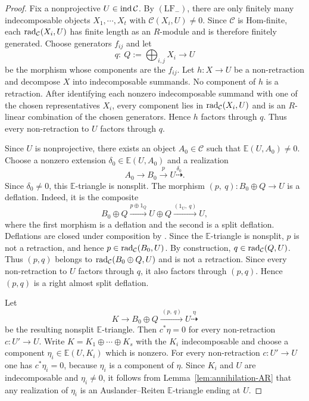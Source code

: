 \documentclass[11pt, twoside]{article}
\def\C{\mathcal{C}}
\def\E{\mathbb{E}}
\numberwithin{equation}{section}
\begin{document}
\begin{proof}
Fix a nonprojective $U\in\ind\C$.  By $(\mathrm{LF}_-)$, there are only
finitely many indecomposable objects $X_1,\cdots,X_t$ with
$\C(X_i,U)\ne0$.  Since $\C$ is Hom-finite, each $\rad_\C(X_i,U)$ has finite length as an
$R$-module and is therefore finitely generated.
Choose generators $f_{ij}$ and let
$$
 q\colon~ Q:=\bigoplus_{i,j}X_i\longrightarrow U
$$
be the morphism whose components are the $f_{ij}$.  Let $h:X\to U$ be a
non-retraction and decompose $X$ into indecomposable summands.  No component of $h$
is a retraction.  After identifying each nonzero indecomposable summand with
one of the chosen representatives $X_i$, every component lies in
$\rad_\C(X_i,U)$ and is an $R$-linear combination of the chosen generators.
Hence $h$ factors through $q$.  Thus every non-retraction to $U$ factors
through $q$.

Since $U$ is nonprojective, there exists an object $A_0\in\C$ such that
$
\E(U,A_0)\neq0.
$
Choose a nonzero extension $\delta_0\in\E(U,A_0)$ and a realization
\[
A_0\longrightarrow B_0\xrightarrow{~p~}U
\overset{\delta_0}{\dashrightarrow}.
\]
Since $\delta_0\neq0$, this $\E$-triangle is nonsplit.
The morphism
$
 (p,~q):B_0\oplus Q\longrightarrow U
$
is a deflation.  Indeed, it is the composite
\[
 B_0\oplus Q\xrightarrow{p\oplus1_Q}U\oplus Q
 \xrightarrow{(1_U,~q)}U,
\]
where the first morphism is a deflation and the second is a split deflation.
Deflations are closed under composition by \cite[Remark~2.16]{NakaokaPalu2019}.
Since the $\E$-triangle is nonsplit,
$p$ is not a retraction, and hence $p\in\rad_\C(B_0,U)$.  By construction,
$q\in\rad_\C(Q,U)$.  Thus $(p,q)$ belongs to
$\rad_\C(B_0\oplus Q,U)$ and is not a retraction.  Since every
non-retraction to $U$ factors through $q$, it also factors through $(p,q)$.
Hence $(p,q)$ is a right almost split deflation.

Let
\[
 K\longrightarrow B_0\oplus Q\xrightarrow{~(p,~q)~}U
 \overset{\eta}{\dashrightarrow}
\]
be the resulting nonsplit $\E$-triangle.  Then $c^*\eta=0$ for every
non-retraction $c:U'\to U$.  Write $K=K_1\oplus\cdots\oplus K_s$ with the
$K_i$ indecomposable and choose a component $\eta_i\in\E(U,K_i)$ which is
nonzero.  For every non-retraction $c\colon U'\to U$ one has
$c^*\eta_i=0$, because $\eta_i$ is a component of $\eta$.  Since
$K_i$ and $U$ are indecomposable and $\eta_i\ne0$,
it follows from Lemma~\ref{lem:annihilation-AR} that  any realization of
$\eta_i$ is an Auslander--Reiten $\E$-triangle ending at $U$.
\end{proof}
\end{document}

